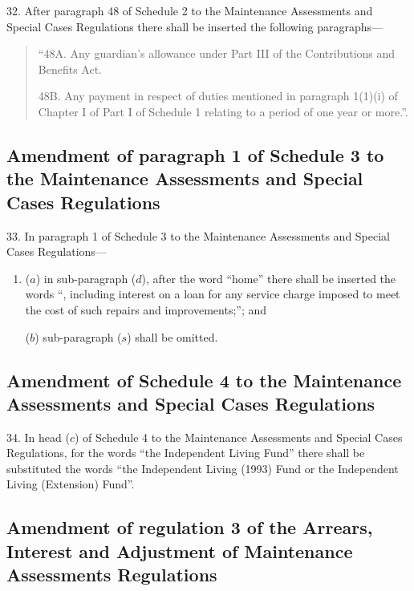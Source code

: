 \documentclass[a4paper]{article}
\begin{document}
32.  After paragraph 48 of Schedule 2 to the Maintenance Assessments and Special Cases Regulations there shall be inserted the following paragraphs---
\begin{quotation}
“48A.  Any guardian’s allowance under Part III of the Contributions and Benefits Act. 

\medskip

48B. Any payment in respect of duties mentioned in paragraph 1(1)(i) of Chapter I of Part I of Schedule 1 relating to a period of one year or more.”.
\end{quotation}

\subsection[33. Amendment of paragraph 1 of Schedule 3 to the Maintenance Assessments and Special Cases Regulations]{Amendment of paragraph 1 of Schedule 3 to the Maintenance Assessments and Special Cases Regulations}

33.  In paragraph 1 of Schedule 3 to the Maintenance Assessments and Special Cases Regulations---
\begin{enumerate}\item[]
($a$) in sub-paragraph ($d$), after the word “home” there shall be inserted the words “, including interest on a loan for any service charge imposed to meet the cost of such repairs and improvements;”; and

($b$) sub-paragraph ($s$) shall be omitted.
\end{enumerate}

\subsection[34. Amendment of Schedule 4 to the Maintenance Assessments and Special Cases Regulations]{Amendment of Schedule 4 to the Maintenance Assessments and Special Cases Regulations}

34.  In head ($c$) of Schedule 4 to the Maintenance Assessments and Special Cases Regulations, for the words “the Independent Living Fund” there shall be substituted the words “the Independent Living (1993) Fund or the Independent Living (Extension) Fund”.

\subsection[35. Amendment of regulation 3 of the Arrears, Interest and Adjustment of Maintenance Assessments Regulations]{Amendment of regulation 3 of the Arrears, Interest and Adjustment of Maintenance Assessments Regulations}
\end{document}
